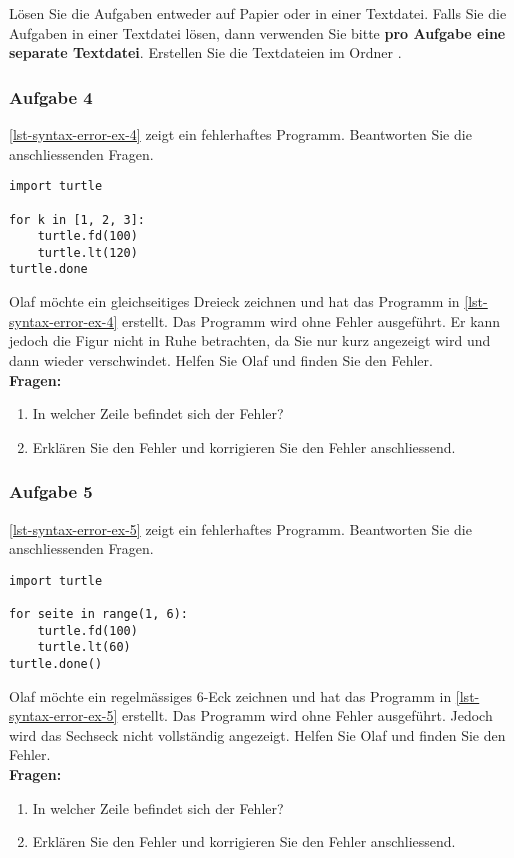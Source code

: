 Lösen Sie die Aufgaben entweder auf Papier oder in einer Textdatei. Falls Sie die Aufgaben in einer Textdatei lösen, dann verwenden Sie bitte \textbf{pro Aufgabe eine separate Textdatei}. Erstellen Sie die Textdateien im Ordner .

\subsubsection{Aufgabe 4}

\autoref{lst-syntax-error-ex-4} zeigt ein fehlerhaftes Programm. Beantworten Sie die anschliessenden Fragen.

\begin{lstlisting}[caption={Das Programm hat einen Semantikfehler.}, label=lst-syntax-error-ex-4, showstringspaces=false]
import turtle

for k in [1, 2, 3]:
    turtle.fd(100)
    turtle.lt(120)
turtle.done
\end{lstlisting}

Olaf möchte ein gleichseitiges Dreieck zeichnen und hat das Programm in \autoref{lst-syntax-error-ex-4} erstellt. Das Programm wird ohne Fehler ausgeführt. Er kann jedoch die Figur nicht in Ruhe betrachten, da Sie nur kurz angezeigt wird und dann wieder verschwindet. Helfen Sie Olaf und finden Sie den Fehler.\\

\textbf{Fragen:}

\begin{enumerate}
\item In welcher Zeile befindet sich der Fehler?
\item Erklären Sie den Fehler und korrigieren Sie den Fehler anschliessend.
\end{enumerate}

\newpage

\subsubsection{Aufgabe 5}

\autoref{lst-syntax-error-ex-5} zeigt ein fehlerhaftes Programm. Beantworten Sie die anschliessenden Fragen.

\begin{lstlisting}[caption={Das Programm hat einen Semantikfehler.}, label=lst-syntax-error-ex-5, showstringspaces=false]
import turtle

for seite in range(1, 6):
    turtle.fd(100)
    turtle.lt(60)
turtle.done()
\end{lstlisting}

Olaf möchte ein regelmässiges $6$-Eck zeichnen und hat das Programm in \autoref{lst-syntax-error-ex-5} erstellt. Das Programm wird ohne Fehler ausgeführt. Jedoch wird das Sechseck nicht vollständig angezeigt. Helfen Sie Olaf und finden Sie den Fehler.\\

\textbf{Fragen:}

\begin{enumerate}
\item In welcher Zeile befindet sich der Fehler?
\item Erklären Sie den Fehler und korrigieren Sie den Fehler anschliessend.
\end{enumerate}
